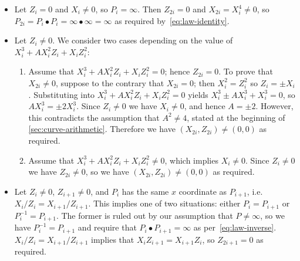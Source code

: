 \documentclass{article}
\begin{document}
\begin{itemize}
    \item Let $Z_i=0$ and $X_i \ne 0$, so $P_i = \infty$.
        Then $Z_{2i}=0$ and $X_{2i} = X_i^4 \ne 0$, so $P_{2i} = P_i \bullet P_i = \infty\bullet\infty = \infty$ as required by~\eqref{eq:law-identity}.
    \item Let $Z_i \ne 0$. We consider two cases depending on the value of $X_i^3 + AX_i^2 Z_i + X_i Z_i^2$:
        \begin{enumerate}
            \item Assume that $X_i^3 + AX_i^2 Z_i + X_i Z_i^2 = 0$; hence $Z_{2i} = 0$.
                To prove that $X_{2i} \ne 0$, suppose to the contrary that $X_{2i}=0$; then $X_i^2 = Z_i^2$ so $Z_i = \pm X_i$.
                Substituting into $X_i^3 + AX_i^2 Z_i + X_i Z_i^2 = 0$ yields $X_i^3 \pm AX_i^3 + X_i^3 = 0$, so $AX_i^3 = \pm 2X_i^3$.
                Since $Z_i \ne 0$ we have $X_i \ne 0$, and hence $A = \pm 2$.
                However, this contradicts the assumption that $A^2 \ne 4$, stated at the beginning of \autoref{sec:curve-arithmetic}.
                Therefore we have $(X_{2i}, Z_{2i}) \ne (0, 0)$ as required.
            \item Assume that $X_i^3 + AX_i^2 Z_i + X_i Z_i^2 \ne 0$, which implies $X_i \ne 0$.
                Since $Z_i \ne 0$ we have $Z_{2i} \ne 0$, so we have $(X_{2i}, Z_{2i}) \ne (0, 0)$ as required.
        \end{enumerate}
    \item Let $Z_i \ne 0$, $Z_{i+1} \ne 0$, and $P_i$ has the same $x$ coordinate as $P_{i+1}$, i.e.\ $X_i/Z_i = X_{i+1}/Z_{i+1}$.
        This implies one of two situations: either $P_i = P_{i+1}$ or $P_i^{-1} = P_{i+1}$.
        The former is ruled out by our assumption that $P \ne \infty$, so we have $P_i^{-1} = P_{i+1}$ and require that $P_i \bullet P_{i+1} = \infty$ as per~\eqref{eq:law-inverse}.
        $X_i/Z_i = X_{i+1}/Z_{i+1}$ implies that $X_i Z_{i+1} = X_{i+1} Z_{i}$, so $Z_{2i+1} = 0$ as required.


\end{itemize}
\end{document}
